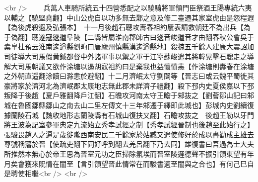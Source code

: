<br />
　　兵萬人車騎所統五十四營悉配之以驍騎將軍領門臣祭酒王陽專統六夷以輔之【驍堅堯翻】中山公虎自以功多無去鄴之意及修二臺遷其家室虎由是怨程遐【為後虎殺遐及弘張本】　十一月後趙石聰攻夀春祖約屢表請救朝廷不為出兵【為于偽翻】聰遂寇逡遒阜陵【二縣皆屬淮南郡師古曰逡音峻遒音才由翻春秋公會吳于槖臯杜預云淮南逡遒縣劉昫曰唐廬州慎縣漢逡遒縣地】殺掠五千餘人建康大震詔加司徒導大司馬假黄鉞都督中外諸軍事以禦之軍于江寜蘇峻遣其將韓晃擊石聰走之導解大司馬朝議又欲作涂塘以遏胡寇祖約曰是棄我也益懷憤恚【作涂塘則夀春在涂塘之外朝直遥翻涂讀曰滁恚於避翻】十二月濟岷太守劉闓等【晉志曰或云魏平蜀徙其豪將家於濟河北為濟岷郡太康地志無此郡未詳濟子禮翻】殺下邳内史夏侯嘉以下邳叛降于後趙【夏戶雅翻降戶江翻】石瞻攻河南太守王瞻于邾抜之【劉薈鄒山記曰邾城在魯國鄒縣鄒山之南去山二里左傳文十三年邾遷于繹即此城也】彭城内史劉續復據蘭陵石城【魏收地形志蘭陵縣有石城山復扶又翻】石瞻攻抜之　後趙王勒以牙門將王波為記室參軍典定九流始立秀孝試經之制【秀孝試經晉制也後趙至此始行之】　張駿畏趙人之逼是歲徙隴西南安民二千餘家於姑臧又遣使修好於成以書勸成主雄去尊號稱藩於晉【使疏吏翻下同好呼到翻去羌呂翻下乃去同】雄復書曰吾過為士大夫所推然本無心於帝王思為晉室元功之臣掃除氛埃而晉室陵遲德聲不振引領東望有年月矣會獲來貺情在闇至【言引領望晉此情常在而駿書適至闇與之合也】有何己巳自是聘使相繼<br />
<br />
